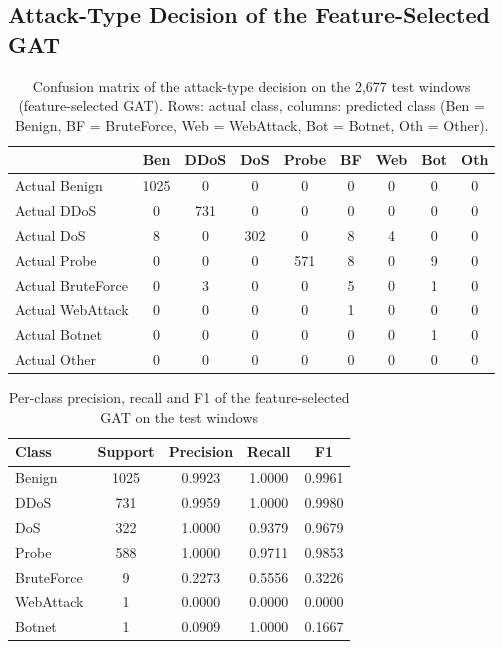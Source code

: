 \begin{appendices}
\section{Attack-Type Decision of the Feature-Selected GAT}
\begin{table}[htbp]
\centering
\caption{Confusion matrix of the attack-type decision on the 2,677 test windows (feature-selected GAT). Rows: actual class, columns: predicted class (Ben = Benign, BF = BruteForce, Web = WebAttack, Bot = Botnet, Oth = Other).}
\label{tab:cm}
\small
\begin{tabular}{|l|c|c|c|c|c|c|c|c|}
\hline
 & \textbf{Ben} & \textbf{DDoS} & \textbf{DoS} & \textbf{Probe} & \textbf{BF} & \textbf{Web} & \textbf{Bot} & \textbf{Oth} \\ \hline
Actual Benign & 1025 & 0 & 0 & 0 & 0 & 0 & 0 & 0 \\ \hline
Actual DDoS & 0 & 731 & 0 & 0 & 0 & 0 & 0 & 0 \\ \hline
Actual DoS & 8 & 0 & 302 & 0 & 8 & 4 & 0 & 0 \\ \hline
Actual Probe & 0 & 0 & 0 & 571 & 8 & 0 & 9 & 0 \\ \hline
Actual BruteForce & 0 & 3 & 0 & 0 & 5 & 0 & 1 & 0 \\ \hline
Actual WebAttack & 0 & 0 & 0 & 0 & 1 & 0 & 0 & 0 \\ \hline
Actual Botnet & 0 & 0 & 0 & 0 & 0 & 0 & 1 & 0 \\ \hline
Actual Other & 0 & 0 & 0 & 0 & 0 & 0 & 0 & 0 \\ \hline
\end{tabular}
\end{table}

\begin{table}[htbp]
\centering
\caption{Per-class precision, recall and F1 of the feature-selected GAT on the test windows}
\label{tab:pc}
\small
\begin{tabular}{|l|c|c|c|c|}
\hline
\textbf{Class} & \textbf{Support} & \textbf{Precision} & \textbf{Recall} & \textbf{F1} \\ \hline
Benign & 1025 & 0.9923 & 1.0000 & 0.9961 \\ \hline
DDoS & 731 & 0.9959 & 1.0000 & 0.9980 \\ \hline
DoS & 322 & 1.0000 & 0.9379 & 0.9679 \\ \hline
Probe & 588 & 1.0000 & 0.9711 & 0.9853 \\ \hline
BruteForce & 9 & 0.2273 & 0.5556 & 0.3226 \\ \hline
WebAttack & 1 & 0.0000 & 0.0000 & 0.0000 \\ \hline
Botnet & 1 & 0.0909 & 1.0000 & 0.1667 \\ \hline
\end{tabular}
\end{table}


\end{appendices}
